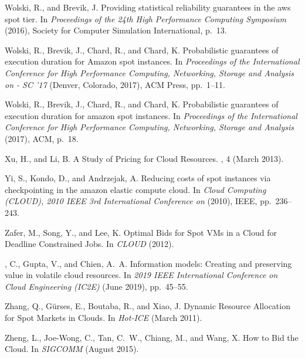 \documentclass[sigconf]{acmart} %
\begin{document}
\begin{thebibliography}{10}
{\sc Wolski, R., and Brevik, J.}
\newblock Providing statistical reliability guarantees in the aws spot tier.
\newblock In {\em Proceedings of the 24th High Performance Computing
  Symposium\/} (2016), Society for Computer Simulation International, p.~13.

{\sc Wolski, R., Brevik, J., Chard, R., and Chard, K.}
\newblock Probabilistic guarantees of execution duration for {Amazon} spot
  instances.
\newblock In {\em Proceedings of the {International} {Conference} for {High}
  {Performance} {Computing}, {Networking}, {Storage} and {Analysis} on - {SC}
  '17\/} (Denver, Colorado, 2017), ACM Press, pp.~1--11.

{\sc Wolski, R., Brevik, J., Chard, R., and Chard, K.}
\newblock Probabilistic guarantees of execution duration for amazon spot
  instances.
\newblock In {\em Proceedings of the International Conference for High
  Performance Computing, Networking, Storage and Analysis\/} (2017), ACM,
  p.~18.

{\sc Xu, H., and Li, B.}
\newblock A {S}tudy of {P}ricing for {C}loud {R}esources.
, 4 (March 2013).

{\sc Yi, S., Kondo, D., and Andrzejak, A.}
\newblock Reducing costs of spot instances via checkpointing in the amazon
  elastic compute cloud.
\newblock In {\em Cloud Computing (CLOUD), 2010 IEEE 3rd International
  Conference on\/} (2010), IEEE, pp.~236--243.

{\sc Zafer, M., Song, Y., and Lee, K.}
\newblock Optimal {B}ids for {S}pot {V}{M}s in a {C}loud for {D}eadline
  {C}onstrained {J}obs.
\newblock In {\em CLOUD\/} (2012).

{, C., {Gupta}, V., and {Chien}, A.~A.}
\newblock Information models: Creating and preserving value in volatile cloud
  resources.
\newblock In {\em 2019 IEEE International Conference on Cloud Engineering
  (IC2E)\/} (June 2019), pp.~45--55.

{\sc Zhang, Q., G\"{u}rses, E., Boutaba, R., and Xiao, J.}
\newblock Dynamic {R}esource {A}llocation for {S}pot {M}arkets in {C}louds.
\newblock In {\em Hot-ICE\/} (March 2011).

{\sc Zheng, L., Joe-Wong, C., Tan, C.~W., Chiang, M., and Wang, X.}
\newblock How to {B}id the {C}loud.
\newblock In {\em SIGCOMM\/} (August 2015).

\end{thebibliography}

%
%
%
\end{document}
